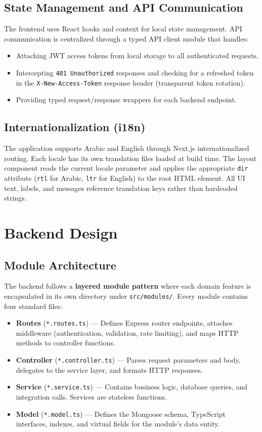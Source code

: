 \subsection{State Management and API Communication}
The frontend uses React hooks and context for local state management. API communication is centralized through a typed API client module that handles:
\begin{itemize}[leftmargin=*]
    \item Attaching JWT access tokens from local storage to all authenticated requests.
    \item Intercepting \texttt{401 Unauthorized} responses and checking for a refreshed token in the \texttt{X-New-Access-Token} response header (transparent token rotation).
    \item Providing typed request/response wrappers for each backend endpoint.
\end{itemize}

\subsection{Internationalization (i18n)}
The application supports Arabic and English through Next.js internationalized routing. Each locale has its own translation files loaded at build time. The layout component reads the current locale parameter and applies the appropriate \texttt{dir} attribute (\texttt{rtl} for Arabic, \texttt{ltr} for English) to the root HTML element. All UI text, labels, and messages reference translation keys rather than hardcoded strings.

\section{Backend Design}

\subsection{Module Architecture}
The backend follows a \textbf{layered module pattern} where each domain feature is encapsulated in its own directory under \texttt{src/modules/}. Every module contains four standard files:

\begin{itemize}[leftmargin=*]
    \item \textbf{Routes} (\texttt{*.routes.ts}) — Defines Express router endpoints, attaches middleware (authentication, validation, rate limiting), and maps HTTP methods to controller functions.
    \item \textbf{Controller} (\texttt{*.controller.ts}) — Parses request parameters and body, delegates to the service layer, and formats HTTP responses.
    \item \textbf{Service} (\texttt{*.service.ts}) — Contains business logic, database queries, and integration calls. Services are stateless functions.
    \item \textbf{Model} (\texttt{*.model.ts}) — Defines the Mongoose schema, TypeScript interfaces, indexes, and virtual fields for the module's data entity.
\end{itemize}

